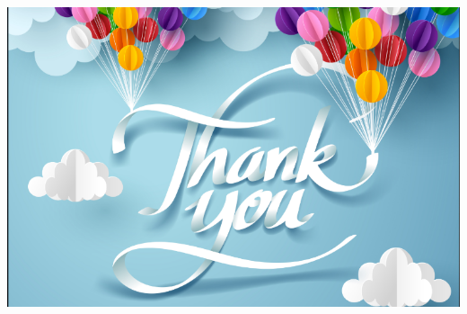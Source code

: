 \documentclass[notheorems,hyperref={bookmarks=true}]{beamer}
\theoremstyle{plain}
\numberwithin{equation}{section}
\begin{document}
\begin{footnotesize}
\begin{frame}
\begin{center}
\includegraphics[scale=0.4]{thanks.png}
\end{center}
\end{frame}








\end{footnotesize}
\end{document}
